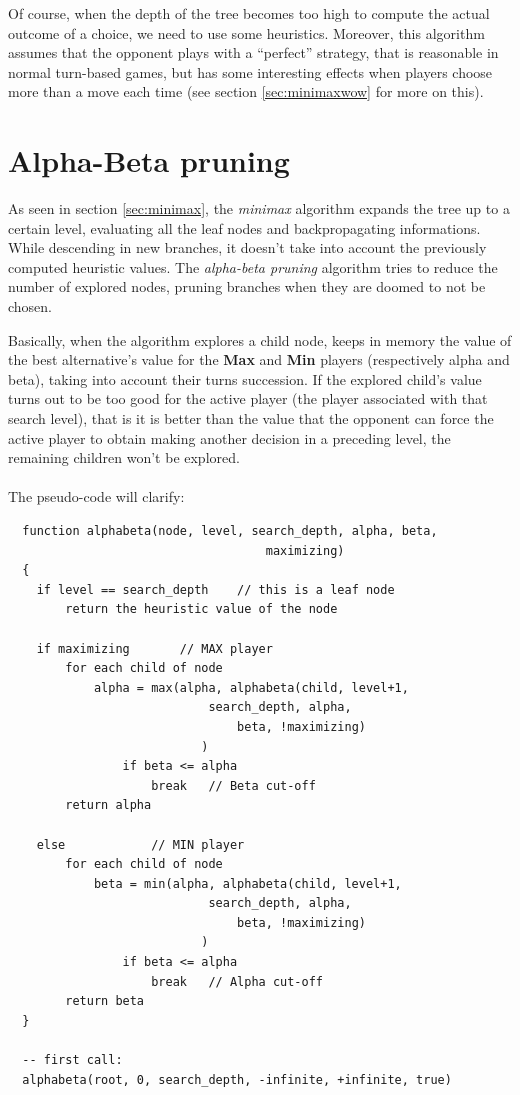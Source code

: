 Of course, when the depth of the tree becomes too high to compute the actual outcome of a choice, we need to use some heuristics. Moreover, this algorithm assumes that the opponent plays with a ``perfect'' strategy, that is reasonable in normal turn-based games, but has some interesting effects when players choose more than a move each time (see section \ref{sec:minimaxwow} for more on this).

\section{Alpha-Beta pruning}
As seen in section \ref{sec:minimax}, the \textit{minimax} algorithm expands the tree up to a certain level, evaluating all the leaf nodes and backpropagating informations.
While descending in new branches, it doesn't take into account the previously computed heuristic values.
The \textit{alpha-beta pruning} algorithm tries to reduce the number of explored nodes, pruning branches when they are doomed to not be chosen.

Basically, when the algorithm explores a child node, keeps in memory the value of the best alternative's value for the \textbf{Max} and \textbf{Min} players (respectively alpha and beta), taking into account their turns succession.
If the explored child's value turns out to be too good for the active player (the player associated with that search level), that is it is better than the value that the opponent can force the active player to obtain making another decision in a preceding level, the remaining children won't be explored.\\
\\
The pseudo-code will clarify:\\
{\footnotesize
\lstset{language=C}
\begin{lstlisting}
  function alphabeta(node, level, search_depth, alpha, beta,
                     				maximizing)
  {
    if level == search_depth	// this is a leaf node
    	return the heuristic value of the node
    
    if maximizing		// MAX player
    	for each child of node
        	alpha = max(alpha, alphabeta(child, level+1,
                			search_depth, alpha,
                        		beta, !maximizing)
                           )
                if beta <= alpha
                	break	// Beta cut-off
        return alpha
        
    else			// MIN player
    	for each child of node
        	beta = min(alpha, alphabeta(child, level+1,
                			search_depth, alpha,
                        		beta, !maximizing)
                           )
                if beta <= alpha
                	break	// Alpha cut-off
        return beta
  }
  
  -- first call:
  alphabeta(root, 0, search_depth, -infinite, +infinite, true)
\end{lstlisting}
}

